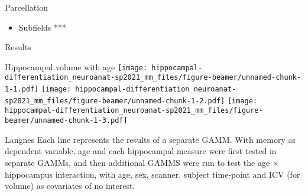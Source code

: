 \documentclass[
  ignorenonframetext,
]{beamer}
\providecommand{\tightlist}{%
  \setlength{\itemsep}{0pt}\setlength{\parskip}{0pt}}
\begin{document}
\begin{frame}{Parcellation}
\protect\hypertarget{parcellation}{}
\begin{itemize}
\tightlist
\item
  Subfields *** \href{fsparcellation.png}{}
\end{itemize}
\end{frame}

\begin{frame}{Results}
\protect\hypertarget{results}{}
\end{frame}

\begin{frame}{Hippocampal volume with age}
\protect\hypertarget{hippocampal-volume-with-age}{}
\texttt{[image: hippocampal-differentiation\_neuroanat-sp2021\_mm\_files/figure-beamer/unnamed-chunk-1-1.pdf]}
\texttt{[image: hippocampal-differentiation\_neuroanat-sp2021\_mm\_files/figure-beamer/unnamed-chunk-1-2.pdf]}
\texttt{[image: hippocampal-differentiation\_neuroanat-sp2021\_mm\_files/figure-beamer/unnamed-chunk-1-3.pdf]}

Langnes Each line represents the results of a separate GAMM. With memory
as dependent variable, age and each hippocampal measure were first
tested in separate GAMMs, and then additional GAMMS were run to test the
age × hippocampus interaction, with age, sex, scanner, subject
time-point and ICV (for volume) as covariates of no interest.
\end{frame}
\end{document}
